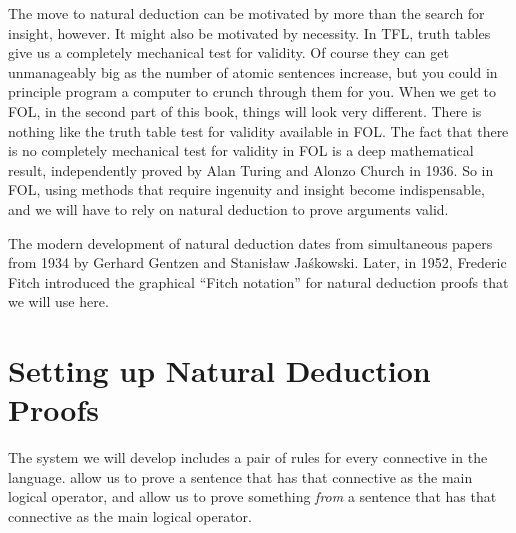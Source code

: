 The move to natural deduction can be motivated by more than the search for insight, however. It might also be motivated by necessity. In TFL, truth tables give us a  completely mechanical test for validity.  Of course they can get unmanageably big as the number of atomic sentences increase, but you could in principle program a computer to crunch through them for you.   When we get to FOL, in the second part of this book, things will look very different. There is nothing like the truth table test for validity available in FOL.  The fact that there is no completely mechanical test for validity in FOL is a deep mathematical result, independently proved by Alan Turing and Alonzo Church in 1936.  So in FOL, using methods that require ingenuity and insight become indispensable, and we will have to rely on natural deduction to prove arguments valid.

The modern development of natural deduction dates from simultaneous papers from 1934 by Gerhard Gentzen and Stanis\l{}aw Ja\'{s}kowski.   Later, in 1952, Frederic Fitch introduced the graphical ``Fitch notation'' for natural deduction proofs that we will use here.  %



\section{Setting up Natural Deduction Proofs}\label{s:BasicTFL}

The  system we will develop includes a pair of rules for every connective in the language.   allow us to prove a sentence that has that connective as the main logical operator, and  allow us to prove something \emph{from} a sentence that has that connective as the main logical operator.  %

